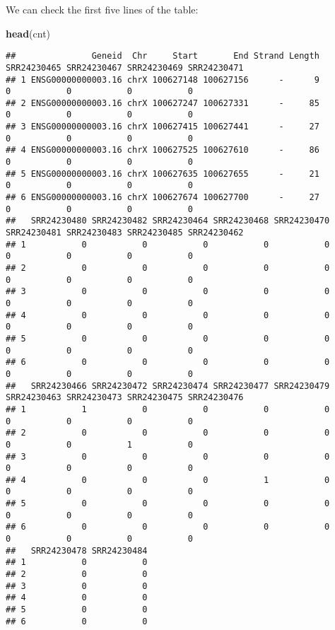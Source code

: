 \documentclass[
]{article}
\newenvironment{Shaded}{\begin{snugshade}}{\end{snugshade}}
\newcommand{\FunctionTok}[1]{\textcolor[rgb]{0.13,0.29,0.53}{\textbf{#1}}}
\newcommand{\NormalTok}[1]{#1}
\begin{document}
We can check the first five lines of the table:

\begin{Shaded}
\begin{Highlighting}[]
\FunctionTok{head}\NormalTok{(cnt)}
\end{Highlighting}
\end{Shaded}

\begin{verbatim}
##               Geneid  Chr     Start       End Strand Length SRR24230465 SRR24230467 SRR24230469 SRR24230471
## 1 ENSG00000000003.16 chrX 100627148 100627156      -      9           0           0           0           0
## 2 ENSG00000000003.16 chrX 100627247 100627331      -     85           0           0           0           0
## 3 ENSG00000000003.16 chrX 100627415 100627441      -     27           0           0           0           0
## 4 ENSG00000000003.16 chrX 100627525 100627610      -     86           0           0           0           0
## 5 ENSG00000000003.16 chrX 100627635 100627655      -     21           0           0           0           0
## 6 ENSG00000000003.16 chrX 100627674 100627700      -     27           0           0           0           0
##   SRR24230480 SRR24230482 SRR24230464 SRR24230468 SRR24230470 SRR24230481 SRR24230483 SRR24230485 SRR24230462
## 1           0           0           0           0           0           0           0           0           0
## 2           0           0           0           0           0           0           0           0           0
## 3           0           0           0           0           0           0           0           0           0
## 4           0           0           0           0           0           0           0           0           0
## 5           0           0           0           0           0           0           0           0           0
## 6           0           0           0           0           0           0           0           0           0
##   SRR24230466 SRR24230472 SRR24230474 SRR24230477 SRR24230479 SRR24230463 SRR24230473 SRR24230475 SRR24230476
## 1           1           0           0           0           0           0           0           0           0
## 2           0           0           0           0           0           0           0           1           0
## 3           0           0           0           0           0           0           0           0           0
## 4           0           0           0           1           0           0           0           0           0
## 5           0           0           0           0           0           0           0           0           0
## 6           0           0           0           0           0           0           0           0           0
##   SRR24230478 SRR24230484
## 1           0           0
## 2           0           0
## 3           0           0
## 4           0           0
## 5           0           0
## 6           0           0
\end{verbatim}
\end{document}
